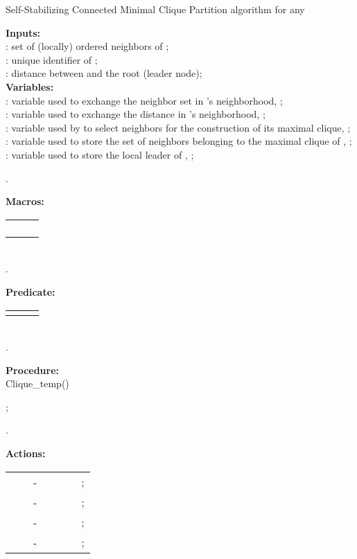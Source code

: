 \documentclass[11pt,letterpaper,onecolumn]{article}
\begin{document}
\begin{algorithm}[t]
\caption{\quad Self-Stabilizing Connected Minimal Clique Partition algorithm for any \label{algo}}
\smallskip
\begin{scriptsize}
{\bf Inputs:}\\
\hspace*{1cm}: set of (locally) ordered neighbors of ;\\
\hspace*{1cm}: unique identifier of ;\\
\hspace*{1cm}: distance between  and the root (leader node);\\
{\bf Variables:}\\
\hspace*{1cm}: variable used to exchange the neighbor set  in 's neighborhood, ;\\
\hspace*{1cm}: variable used to exchange the distance  in 's neighborhood, ;\\
\hspace*{1cm}: variable used by  to select neighbors for the construction of its maximal clique, ;\\
\hspace*{1cm}: variable used to store the set of neighbors belonging to the maximal clique of , ;\\
\hspace*{1cm}: variable used to store the local leader of , ;

.\dotfill\ 

{\bf Macros:}\\
\begin{tabular}{lll}
 &  & \\
 &  & \\
 &  & \\
 &  & \\
\end{tabular}\\
.\dotfill\

{\bf Predicate:}\\
\begin{tabular}{lll}
 &  & \\
\end{tabular}\\
.\dotfill\

{\bf Procedure:}\\
Clique\_temp()
\begin{algorithmic}[1]
\STATE{}
\FORALL{}
\IF{}
\STATE{}
\ENDIF
\ENDFOR
\RETURN ;

\end{algorithmic}
.\dotfill\


{\bf Actions:}\\
\begin{tabular}{lllllll}
&& -  &  &  &  & ;\\
&& - &  &  &  & ;\\
&& - &  &  &  & ;\\
&& - &  &  &  & ;\\
\end{tabular}
\end{scriptsize}
\end{algorithm}
\end{document}
